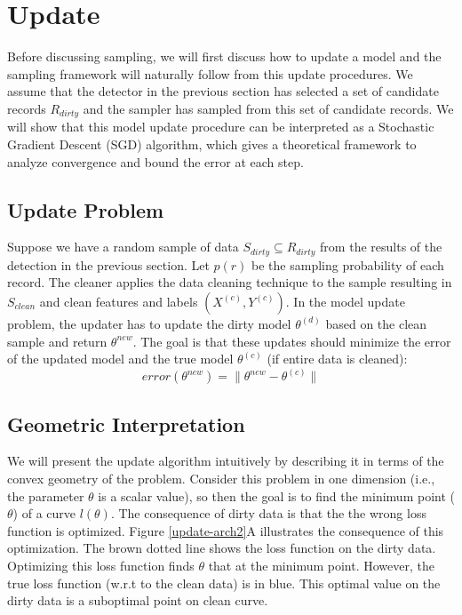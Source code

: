 \section{Update}\label{model-update}
Before discussing sampling, we will first discuss how to update a model and the sampling framework will naturally follow from this update procedures.
We assume that the detector in the previous section has selected 
a set of candidate records $R_{dirty}$ and the sampler has sampled from this
set of candidate records.
We will show that this model update procedure can be interpreted as a Stochastic 
Gradient Descent (SGD) algorithm, which gives a theoretical framework to analyze
convergence and bound the error at each step.

\subsection{Update Problem}
Suppose we have a random sample of data $S_{dirty} \subseteq R_{dirty}$ from the results of the detection in the previous section.
Let $p(r)$ be the sampling probability of each record.
The cleaner applies the data cleaning technique to the sample resulting in $S_{clean}$ and clean features and labels $(X^{(c)},Y^{(c)})$. 
In the model update problem, the updater has to update the dirty model $\theta^{(d)}$ based on the clean sample and return $\theta^{new}$.
The goal is that these updates should minimize the error of the updated model and the true model $\theta^{(c)}$ (if entire data is cleaned):
\[
error(\theta^{new}) = \| \theta^{new} - \theta^{(c)} \|
\]

\subsection{Geometric Interpretation}
We will present the update algorithm intuitively by describing it in terms of the convex geometry of the problem.
Consider this problem in one dimension (i.e., the parameter $\theta$ is a scalar value), so then the goal is to find the minimum point ($\theta$) of a curve $l(\theta)$.
The consequence of dirty data is that the the wrong loss function is optimized.
Figure \ref{update-arch2}A illustrates the consequence of this optimization.
The brown dotted line shows the loss function on the dirty data.
Optimizing this loss function finds $\theta$ that at the minimum point.
However, the true loss function (w.r.t to the clean data) is in blue.
This optimal value on the dirty data is a suboptimal point on clean curve.

